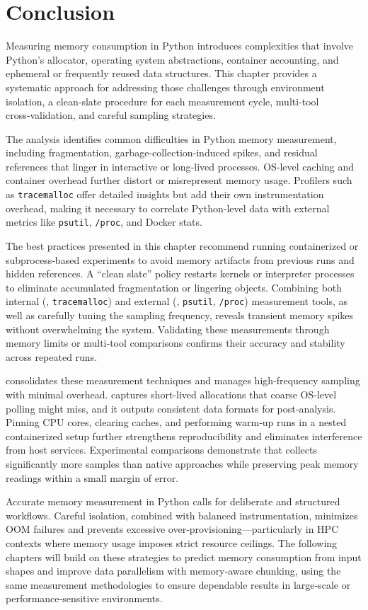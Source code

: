 \section{Conclusion}
\label{sec:mmc-conclusion}

Measuring memory consumption in Python introduces complexities that involve Python’s allocator, operating system abstractions, container accounting, and ephemeral or frequently reused data structures.
This chapter provides a systematic approach for addressing those challenges through environment isolation, a clean‑slate procedure for each measurement cycle, multi‑tool cross‑validation, and careful sampling strategies.

The analysis identifies common difficulties in Python memory measurement, including fragmentation, garbage‑collection‑induced spikes, and residual references that linger in interactive or long‑lived processes.
\ac{OS}‑level caching and container overhead further distort or misrepresent memory usage.
Profilers such as \texttt{tracemalloc} offer detailed insights but add their own instrumentation overhead, making it necessary to correlate Python‑level data with external metrics like \texttt{psutil}, \texttt{/proc}, and Docker stats.

The best practices presented in this chapter recommend running containerized or subprocess‑based experiments to avoid memory artifacts from previous runs and hidden references.
A “clean slate” policy restarts kernels or interpreter processes to eliminate accumulated fragmentation or lingering objects.
Combining both internal (\eg, \texttt{tracemalloc}) and external (\eg, \texttt{psutil}, \texttt{/proc}) measurement tools, as well as carefully tuning the sampling frequency, reveals transient memory spikes without overwhelming the system.
Validating these measurements through memory limits or multi‑tool comparisons confirms their accuracy and stability across repeated runs.

\traceq consolidates these measurement techniques and manages high‑frequency sampling with minimal overhead.
\traceq captures short‑lived allocations that coarse \ac{OS}‑level polling might miss, and it outputs consistent data formats for post‑analysis.
Pinning \ac{CPU} cores, clearing caches, and performing warm‑up runs in a nested containerized setup further strengthens reproducibility and eliminates interference from host services.
Experimental comparisons demonstrate that \traceq collects significantly more samples than native approaches while preserving peak memory readings within a small margin of error.

Accurate memory measurement in Python calls for deliberate and structured workflows.
Careful isolation, combined with balanced instrumentation, minimizes \ac{OOM} failures and prevents excessive over‑provisioning—particularly in \ac{HPC} contexts where memory usage imposes strict resource ceilings.
The following chapters will build on these strategies to predict memory consumption from input shapes and improve data parallelism with memory‑aware chunking, using the same measurement methodologies to ensure dependable results in large‑scale or performance‑sensitive environments.